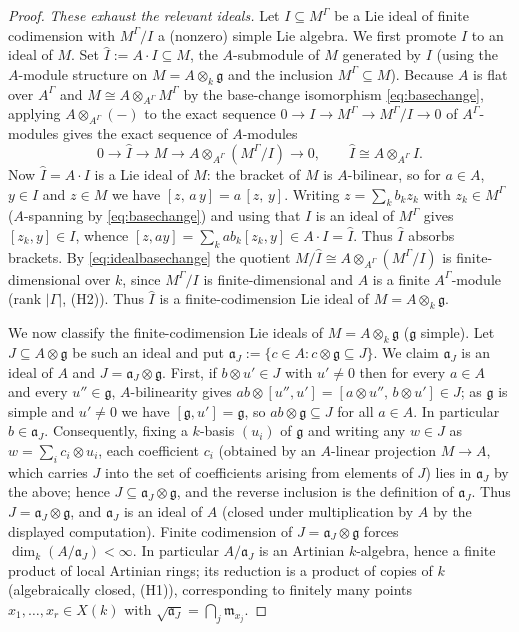 \documentclass{amsart}
\theoremstyle{definition}
\newcommand{\g}{\mathfrak{g}}
\newcommand{\M}{M}
\begin{document}
\begin{proof}
\emph{These exhaust the relevant ideals.}  Let $I\subseteq\M^\Gamma$ be a
Lie ideal of finite codimension with $\M^\Gamma/I$ a (nonzero) simple Lie
algebra.  We first promote $I$ to an ideal of $\M$.  Set
$\widehat I:=A\cdot I\subseteq\M$, the $A$-submodule of $\M$ generated by
$I$ (using the $A$-module structure on $\M=A\otimes_k\g$ and the inclusion
$\M^\Gamma\subseteq\M$).  Because $A$ is flat over $A^\Gamma$ and
$\M\cong A\otimes_{A^\Gamma}\M^\Gamma$ by the base-change isomorphism
\eqref{eq:basechange}, applying $A\otimes_{A^\Gamma}(-)$ to the exact
sequence $0\to I\to\M^\Gamma\to\M^\Gamma/I\to0$ of $A^\Gamma$-modules gives
the exact sequence of $A$-modules
\begin{equation}\label{eq:idealbasechange}
0\to\widehat I\to\M\to A\otimes_{A^\Gamma}(\M^\Gamma/I)\to0 ,
\qquad\widehat I\cong A\otimes_{A^\Gamma}I .
\end{equation}
Now $\widehat I=A\cdot I$ is a Lie ideal of $\M$: the bracket of $\M$ is
$A$-bilinear, so for $a\in A$, $y\in I$ and $z\in\M$ we have
$[z,\,a\,y]=a\,[z,\,y]$.  Writing $z=\sum_k b_k z_k$ with $z_k\in\M^\Gamma$
($A$-spanning by \eqref{eq:basechange}) and using that $I$ is an ideal of
$\M^\Gamma$ gives $[z_k,y]\in I$, whence $[z,ay]=\sum_k a b_k[z_k,y]\in
A\cdot I=\widehat I$.  Thus $\widehat I$ absorbs brackets.  By
\eqref{eq:idealbasechange} the quotient $\M/\widehat I\cong
A\otimes_{A^\Gamma}(\M^\Gamma/I)$ is finite-dimensional over $k$, since
$\M^\Gamma/I$ is finite-dimensional and $A$ is a finite $A^\Gamma$-module
(rank $|\Gamma|$, (H2)).  Thus $\widehat I$ is a finite-codimension Lie
ideal of $\M=A\otimes_k\g$.

We now classify the finite-codimension Lie ideals of $\M=A\otimes_k\g$
($\g$ simple).  Let $J\subseteq A\otimes\g$ be such an ideal and put
$\mathfrak a_J:=\{c\in A:c\otimes\g\subseteq J\}$.  We claim $\mathfrak
a_J$ is an ideal of $A$ and $J=\mathfrak a_J\otimes\g$.  First, if
$b\otimes u'\in J$ with $u'\ne0$ then for every $a\in A$ and every
$u''\in\g$, $A$-bilinearity gives $ab\otimes[u'',u']=[a\otimes u'',\,
b\otimes u']\in J$; as $\g$ is simple and $u'\ne0$ we have $[\g,u']=\g$, so
$ab\otimes\g\subseteq J$ for all $a\in A$.  In particular
$b\in\mathfrak a_J$.  Consequently, fixing a $k$-basis $(u_i)$ of $\g$ and
writing any $w\in J$ as $w=\sum_i c_i\otimes u_i$, each coefficient $c_i$
(obtained by an $A$-linear projection $\M\to A$, which carries $J$ into the
set of coefficients arising from elements of $J$) lies in $\mathfrak a_J$
by the above; hence $J\subseteq\mathfrak a_J\otimes\g$, and the reverse
inclusion is the definition of $\mathfrak a_J$.  Thus $J=\mathfrak a_J
\otimes\g$, and $\mathfrak a_J$ is an ideal of $A$ (closed under
multiplication by $A$ by the displayed computation).  Finite codimension of
$J=\mathfrak a_J\otimes\g$ forces $\dim_k(A/\mathfrak a_J)<\infty$.  In
particular $A/\mathfrak a_J$ is an Artinian $k$-algebra, hence a finite
product of local Artinian rings; its reduction is a product of copies of
$k$ (algebraically closed, (H1)), corresponding to finitely many points
$x_1,\dots,x_r\in X(k)$ with $\sqrt{\mathfrak a_J}=\bigcap_j\mathfrak
m_{x_j}$.


\end{proof}
\end{document}
